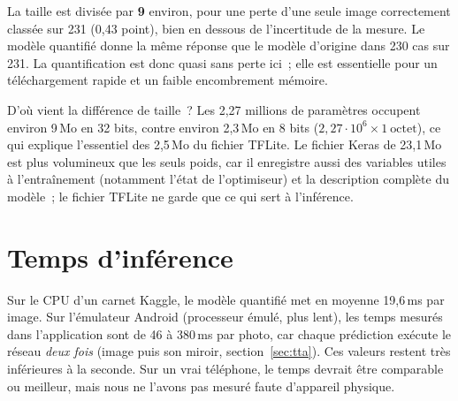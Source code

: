 La taille est divisée par \textbf{9} environ, pour une perte d’une seule image correctement classée sur 231 (0,43 point), bien en dessous de l’incertitude de la mesure. Le modèle quantifié donne la même réponse que le modèle d’origine dans 230 cas sur 231. La quantification est donc quasi sans perte ici~; elle est essentielle pour un téléchargement rapide et un faible encombrement mémoire.

\begin{defbox}{D’où vient la différence de taille~?}
Les 2,27 millions de paramètres occupent environ 9\,Mo en 32 bits, contre environ 2,3\,Mo en 8 bits ($2{,}27\cdot10^6 \times 1\ \text{octet}$), ce qui explique l’essentiel des 2,5\,Mo du fichier TFLite. Le fichier Keras de 23,1\,Mo est plus volumineux que les seuls poids, car il enregistre aussi des variables utiles à l’entraînement (notamment l’état de l’optimiseur) et la description complète du modèle~; le fichier TFLite ne garde que ce qui sert à l’inférence.
\end{defbox}

\section{Temps d’inférence}

Sur le CPU d’un carnet Kaggle, le modèle quantifié met en moyenne 19,6\,ms par image. Sur l’émulateur Android (processeur émulé, plus lent), les temps mesurés dans l’application sont de 46 à 380\,ms par photo, car chaque prédiction exécute le réseau \emph{deux fois} (image puis son miroir, section~\ref{sec:tta}). Ces valeurs restent très inférieures à la seconde. Sur un vrai téléphone, le temps devrait être comparable ou meilleur, mais nous ne l’avons pas mesuré faute d’appareil physique.
